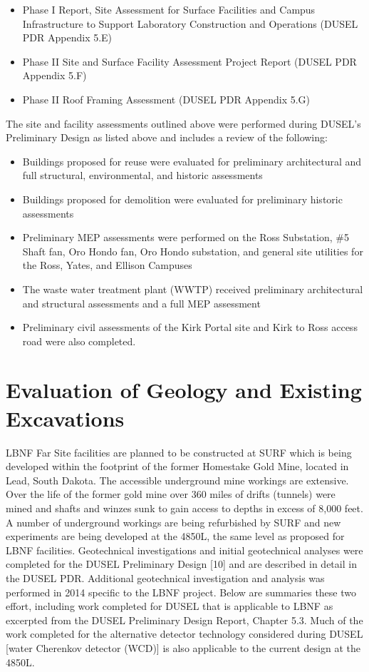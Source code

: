 \begin{itemize}
 \item Phase I Report, Site Assessment for Surface Facilities and Campus Infrastructure to Support Laboratory Construction and Operations (DUSEL PDR Appendix 5.E)
 \item Phase II Site and Surface Facility Assessment Project Report (DUSEL PDR Appendix 5.F)
 \item Phase II Roof Framing Assessment (DUSEL PDR Appendix 5.G)
     \end{itemize}
 The site and facility assessments outlined above were performed during DUSEL's Preliminary Design as listed above and includes a review of the following: 
     \begin{itemize} 
\item Buildings proposed for reuse were evaluated for preliminary architectural and full structural, environmental, and historic assessments
\item Buildings proposed for demolition were evaluated for preliminary historic assessments
\item Preliminary MEP assessments were performed on the Ross Substation, \#5 Shaft fan, Oro Hondo fan, Oro Hondo substation, and general site utilities for the Ross, Yates, and Ellison Campuses
 \item The waste water treatment plant (WWTP) received preliminary architectural and structural assessments and a full MEP assessment
  
 \item Preliminary civil assessments of the Kirk Portal site and Kirk to Ross access road were also completed.
 \end{itemize}


\section{Evaluation of Geology and Existing Excavations}
\label{sec:fscf-site-cond-geo}

LBNF Far Site facilities are planned to be constructed at SURF which is being developed within the footprint of the former Homestake Gold Mine, located in Lead, South Dakota. The accessible underground mine workings are extensive. Over the life of the former gold mine over 360 miles of drifts (tunnels) were mined and shafts and winzes sunk to gain access to depths in excess of 8,000 feet. A number of underground workings are being refurbished by SURF and new experiments are being developed at the 4850L, the same level as proposed for LBNF facilities. Geotechnical investigations and initial geotechnical analyses were completed for the DUSEL Preliminary Design [10] and are described in detail in the DUSEL PDR. Additional geotechnical investigation and analysis was performed in 2014 specific to the LBNF project.  Below are summaries these two effort, including work completed for DUSEL that is applicable to LBNF as excerpted from the DUSEL Preliminary Design Report, Chapter 5.3. Much of the work completed for the alternative detector technology considered during DUSEL [water Cherenkov detector (WCD)] is also applicable to the current design at the 4850L.  


